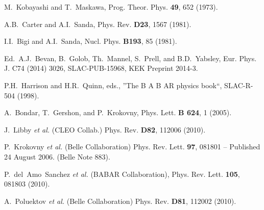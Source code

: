 \documentclass[preprint,aps,showpacs]{revtex4}
\begin{document}
\begin{thebibliography}{99}


M.~Kobayashi and T.~Maskawa, Prog. Theor. Phys. {\bf 49}, 652 (1973).

A.B.~Carter and A.I.~Sanda, Phys. Rev. {\bf D23}, 1567 (1981).

I.I.~Bigi and A.I.~Sanda, Nucl. Phys. {\bf B193}, 85 (1981).

Ed.~A.J.~Bevan, B.~Golob, Th.~Mannel, S.~Prell, and B.D.~Yabsley,
Eur. Phys. J. C74 (2014) 3026, SLAC-PUB-15968, KEK Preprint 2014-3.

P.H.~Harrison and H.R.~Quinn, eds., ''The B A B AR physics book``, SLAC-R-504 (1998).

A.~Bondar, T.~Gershon, and P.~Krokovny, Phys. Lett. {\bf B 624}, 1 (2005).

J.~Libby {\it et al.} (CLEO Collab.) Phys. Rev.  {\bf D82}, 112006 (2010).

P.~Krokovny {\it et al.} (Belle Collaboration)
Phys. Rev. Lett. {\bf 97}, 081801 – Published 24 August 2006. (Belle Note 883).

P.~del~Amo~Sanchez {\it et al.} (BABAR Collaboration), Phys. Rev. Lett. {\bf 105}, 081803 (2010).

A.~Poluektov {\it et al.} (Belle Collaboration) Phys. Rev. {\bf D81}, 112002 (2010).


\end{thebibliography}
\end{document}
